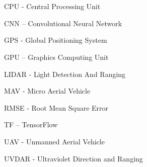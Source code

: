 \section*{} 

CPU     -   Central Processing Unit

CNN		– 	Convolutional Neural Network 

GPS     -   Global Positioning System

GPU     –  	Graphics Computing Unit

LIDAR   -   Light Detection And Ranging

MAV     -   Micro Aerial Vehicle

RMSE    -   Root Mean Square Error

TF		–	TensorFlow

UAV     -   Unmanned Aerial Vehicle

UVDAR   -   Ultraviolet Direction and Ranging